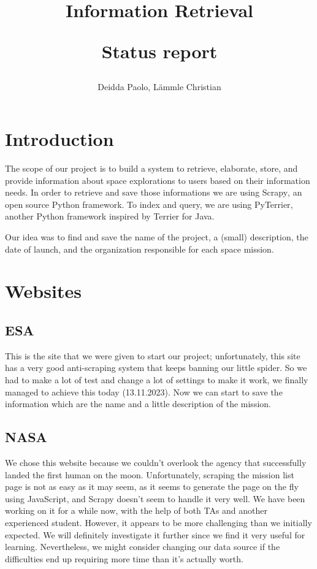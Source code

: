 \documentclass{article}
\title{
Information Retrieval

\begin{large} 
Status report
\end{large} }
\author{Deidda Paolo, Lämmle Christian}
\begin{document}
\maketitle

\section{Introduction}\label{sec:introduction}

The scope of our project is to build a system to retrieve, elaborate, store, and provide information about space explorations to users based on their information needs. In order to retrieve and save those informations we are using Scrapy\textsuperscript{\cite{scrapy}}, an open source Python framework. To index and query, we are using PyTerrier\textsuperscript{\cite{pyterrier}}, another Python framework inspired by Terrier for Java.

Our idea was to find and save the name of the project, a (small) description, the date of launch, and the organization responsible for each space mission.

\section{Websites}

\subsection{ESA\textsuperscript{\cite{esa}}}\label{subsec:esa}
This is the site that we were given to start our project; unfortunately, this site has a very good anti-scraping system that keeps banning our little spider. So we had to make a lot of test and change a lot of settings to make it work, we finally managed to achieve this today (13.11.2023). Now we can start to save the information which are the name and a little description of the mission.

\subsection{NASA\textsuperscript{\cite{nasa}}}\label{subsec:nasa}
We chose this website because we couldn't overlook the agency that successfully landed the first human on the moon. Unfortunately, scraping the mission list page is not as easy as it may seem, as it seems to generate the page on the fly using JavaScript, and Scrapy doesn't seem to handle it very well. We have been working on it for a while now, with the help of both TAs and another experienced student. However, it appears to be more challenging than we initially expected. We will definitely investigate it further since we find it very useful for learning. Nevertheless, we might consider changing our data source if the difficulties end up requiring more time than it's actually worth.
\end{document}

